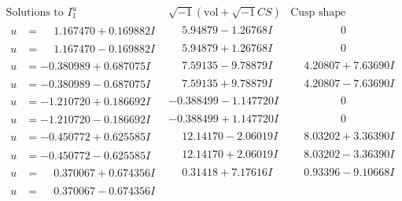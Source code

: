 \documentclass[1p]{elsarticle_modified}
\theoremstyle{definition}
\newcommand{\I}{\sqrt{-1}}
\begin{document}
$$\begin{array}{c|c|c}  
\text{Solutions to }I^u_{1}& \I (\text{vol} + \sqrt{-1}CS) & \text{Cusp shape}\\
 \hline 
\begin{aligned}
u &= \phantom{-}1.167470 + 0.169882 I\end{aligned}
 & \phantom{-}5.94879 - 1.26768 I & \phantom{-0.000000 } 0 \\ \hline\begin{aligned}
u &= \phantom{-}1.167470 - 0.169882 I\end{aligned}
 & \phantom{-}5.94879 + 1.26768 I & \phantom{-0.000000 } 0 \\ \hline\begin{aligned}
u &= -0.380989 + 0.687075 I\end{aligned}
 & \phantom{-}7.59135 - 9.78879 I & \phantom{-}4.20807 + 7.63690 I \\ \hline\begin{aligned}
u &= -0.380989 - 0.687075 I\end{aligned}
 & \phantom{-}7.59135 + 9.78879 I & \phantom{-}4.20807 - 7.63690 I \\ \hline\begin{aligned}
u &= -1.210720 + 0.186692 I\end{aligned}
 & -0.388499 - 1.147720 I & \phantom{-0.000000 } 0 \\ \hline\begin{aligned}
u &= -1.210720 - 0.186692 I\end{aligned}
 & -0.388499 + 1.147720 I & \phantom{-0.000000 } 0 \\ \hline\begin{aligned}
u &= -0.450772 + 0.625585 I\end{aligned}
 & \phantom{-}12.14170 - 2.06019 I & \phantom{-}8.03202 + 3.36390 I \\ \hline\begin{aligned}
u &= -0.450772 - 0.625585 I\end{aligned}
 & \phantom{-}12.14170 + 2.06019 I & \phantom{-}8.03202 - 3.36390 I \\ \hline\begin{aligned}
u &= \phantom{-}0.370067 + 0.674356 I\end{aligned}
 & \phantom{-}0.31418 + 7.17616 I & \phantom{-}0.93396 - 9.10668 I \\ \hline\begin{aligned}
u &= \phantom{-}0.370067 - 0.674356 I\end{aligned}

\end{array}$$
\end{document}
